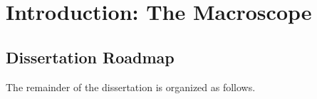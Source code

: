 \chapter{Introduction: The Macroscope} 
\label{chap-introduction}

\section{Dissertation Roadmap}

The remainder of the dissertation is organized as follows.

